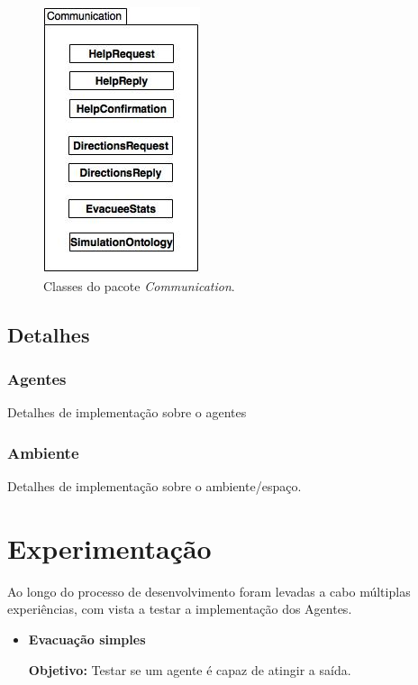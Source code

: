 \documentclass[12pt]{article}
\begin{document}
\begin{titlepage}
\begin{figure}[H]
	\centering
	\includegraphics[scale=0.5]{communication.jpg}
	\caption{Classes do pacote \textit{Communication}.}
	\label{uml}
\end{figure}

\subsection{Detalhes}
\subsubsection{Agentes}
Detalhes de implementação sobre o agentes

\subsubsection{Ambiente}
Detalhes de implementação sobre o ambiente/espaço.

\newpage
\section{Experimentação}

Ao longo do processo de desenvolvimento foram levadas a cabo múltiplas experiências, com vista a testar a implementação dos Agentes.
\begin{itemize}
	
	
\item \textbf{Evacuação simples}

\textbf{Objetivo:} 
                                                                                                                                  	Testar se um agente é capaz de atingir a saída.
	

\end{itemize}
\end{titlepage}
\end{document}
